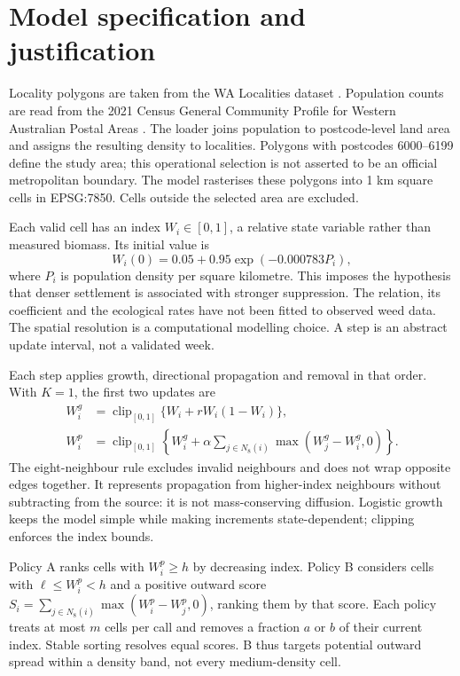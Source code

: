 \documentclass[a4paper,11pt]{article}
\begin{document}
\newpage
\section{Model specification and justification}
Locality polygons are taken from the WA Localities dataset \cite{landgate}. Population counts are read from the 2021 Census General Community Profile for Western Australian Postal Areas \cite{abs}. The loader joins population to postcode-level land area and assigns the resulting density to localities. Polygons with postcodes 6000--6199 define the study area; this operational selection is not asserted to be an official metropolitan boundary. The model rasterises these polygons into 1 km square cells in EPSG:7850. Cells outside the selected area are excluded.

Each valid cell has an index $W_i\in[0,1]$, a relative state variable rather than measured biomass. Its initial value is
\[
W_i(0)=0.05+0.95\exp(-0.000783P_i),
\]
where $P_i$ is population density per square kilometre. This imposes the hypothesis that denser settlement is associated with stronger suppression. The relation, its coefficient and the ecological rates have not been fitted to observed weed data. The spatial resolution is a computational modelling choice. A step is an abstract update interval, not a validated week.

Each step applies growth, directional propagation and removal in that order. With $K=1$, the first two updates are
\begin{align*}
W_i^g &= \operatorname{clip}_{[0,1]}\{W_i+rW_i(1-W_i)\},\\
W_i^p &= \operatorname{clip}_{[0,1]}\left\{W_i^g+
\alpha\sum_{j\in N_8(i)}\max(W_j^g-W_i^g,0)\right\}.
\end{align*}
The eight-neighbour rule excludes invalid neighbours and does not wrap opposite edges together. It represents propagation from higher-index neighbours without subtracting from the source: it is not mass-conserving diffusion. Logistic growth keeps the model simple while making increments state-dependent; clipping enforces the index bounds.

Policy A ranks cells with $W_i^p\geq h$ by decreasing index. Policy B considers cells with $\ell\leq W_i^p<h$ and a positive outward score $S_i=\sum_{j\in N_8(i)}\max(W_i^p-W_j^p,0)$, ranking them by that score. Each policy treats at most $m$ cells per call and removes a fraction $a$ or $b$ of their current index. Stable sorting resolves equal scores. B thus targets potential outward spread within a density band, not every medium-density cell.
\end{document}
